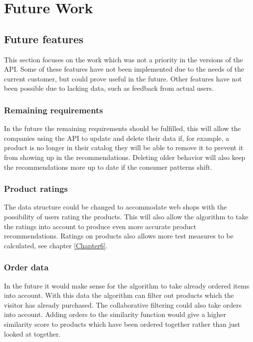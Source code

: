 
\chapter{Future Work} %

\label{Chapter9} %


\section{Future features}
This section focuses on the work which was not a priority in the versions of the API. Some of these features have not been implemented due to the needs of the current customer, but could prove useful in the future. Other features have not been possible due to lacking data, such as feedback from actual users.

\subsection{Remaining requirements}
In the future the remaining requirements should be fulfilled, this will allow the companies using the API to update and delete their data if, for example, a  product is no longer in their catalog they will be able to remove it to prevent it from showing up in the recommendations. Deleting older behavior will also keep the recommendations more up to date if the consumer patterns shift.

\subsection{Product ratings}
The data structure could be changed to accommodate web shops with the possibility of users rating the products. This will also allow the algorithm to take the ratings into account to produce even more accurate product recommendations. Ratings on products also allows more test measures to be calculated, see chapter \ref{Chapter6}.

\subsection{Order data}
In the future it would make sense for the algorithm to take already ordered items into account. With this data the algorithm can filter out products which the visitor has already purchased. The collaborative filtering could also take orders into account. Adding orders to the similarity function would give a higher similarity score to products which have been ordered together rather than just looked at together.

